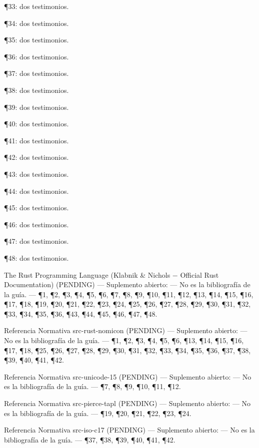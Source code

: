 \documentclass{book}
\begin{document}
\noindent ¶33: dos testimonios.

\noindent ¶34: dos testimonios.

\noindent ¶35: dos testimonios.

\noindent ¶36: dos testimonios.

\noindent ¶37: dos testimonios.

\noindent ¶38: dos testimonios.

\noindent ¶39: dos testimonios.

\noindent ¶40: dos testimonios.

\noindent ¶41: dos testimonios.

\noindent ¶42: dos testimonios.

\noindent ¶43: dos testimonios.

\noindent ¶44: dos testimonios.

\noindent ¶45: dos testimonios.

\noindent ¶46: dos testimonios.

\noindent ¶47: dos testimonios.

\noindent ¶48: dos testimonios.

\medskip

\noindent The Rust Programming Language (Klabnik \& Nichols \(-\) Official Rust Documentation) (PENDING) --- Suplemento abierto: --- No es la bibliografía de la guía. --- \P1, \P2, \P3, \P4, \P5, \P6, \P7, \P8, \P9, \P10, \P11, \P12, \P13, \P14, \P15, \P16, \P17, \P18, \P19, \P20, \P21, \P22, \P23, \P24, \P25, \P26, \P27, \P28, \P29, \P30, \P31, \P32, \P33, \P34, \P35, \P36, \P43, \P44, \P45, \P46, \P47, \P48.

\noindent Referencia Normativa src-rust-nomicon (PENDING) --- Suplemento abierto: --- No es la bibliografía de la guía. --- \P1, \P2, \P3, \P4, \P5, \P6, \P13, \P14, \P15, \P16, \P17, \P18, \P25, \P26, \P27, \P28, \P29, \P30, \P31, \P32, \P33, \P34, \P35, \P36, \P37, \P38, \P39, \P40, \P41, \P42.

\noindent Referencia Normativa src-unicode-15 (PENDING) --- Suplemento abierto: --- No es la bibliografía de la guía. --- \P7, \P8, \P9, \P10, \P11, \P12.

\noindent Referencia Normativa src-pierce-tapl (PENDING) --- Suplemento abierto: --- No es la bibliografía de la guía. --- \P19, \P20, \P21, \P22, \P23, \P24.

\noindent Referencia Normativa src-iso-c17 (PENDING) --- Suplemento abierto: --- No es la bibliografía de la guía. --- \P37, \P38, \P39, \P40, \P41, \P42.
\end{document}
